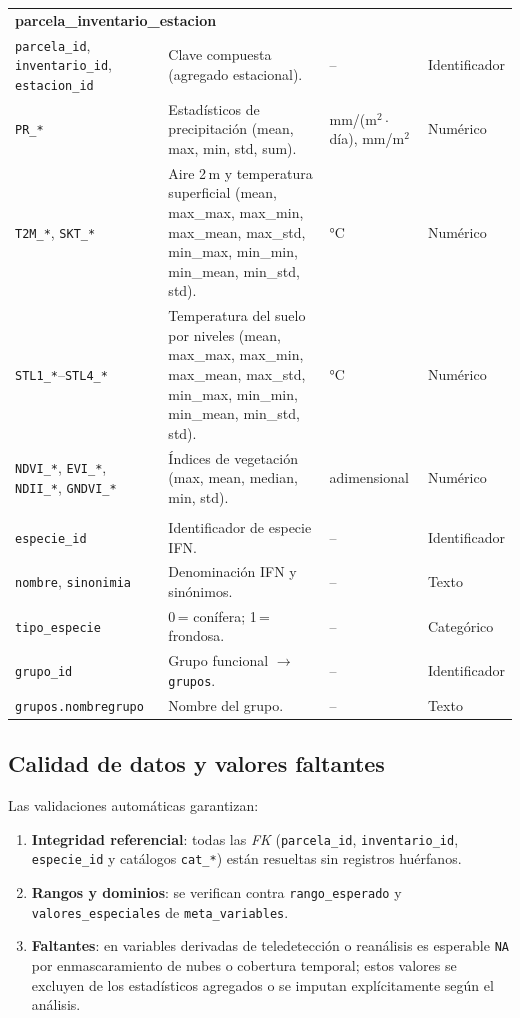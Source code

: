 \begin{longtable}{p{3.2cm} p{7.6cm} p{2.4cm} p{2.4cm}}
\multicolumn{4}{l}{\textbf{parcela\_inventario\_estacion}} \\
\texttt{parcela\_id}, \texttt{inventario\_id}, \texttt{estacion\_id} & Clave compuesta (agregado estacional). & -- & Identificador \\
\texttt{PR\_*} & Estadísticos de precipitación (mean, max, min, std, sum). & mm/(m$^2\cdot$día), mm/m$^2$ & Numérico \\
\texttt{T2M\_*}, \texttt{SKT\_*} & Aire 2\,m y temperatura superficial (mean, max\_max, max\_min, max\_mean, max\_std, min\_max, min\_min, min\_mean, min\_std, std). & °C & Numérico \\
\texttt{STL1\_*}--\texttt{STL4\_*} & Temperatura del suelo por niveles (mean, max\_max, max\_min, max\_mean, max\_std, min\_max, min\_min, min\_mean, min\_std, std). & °C & Numérico \\
\texttt{NDVI\_*}, \texttt{EVI\_*}, \texttt{NDII\_*}, \texttt{GNDVI\_*} & Índices de vegetación (max, mean, median, min, std). & adimensional & Numérico \\
\addlinespace

\multicolumn{4}{l}{\textbf{especies} y \textbf{grupos}} \\
\texttt{especie\_id} & Identificador de especie IFN. & -- & Identificador \\
\texttt{nombre}, \texttt{sinonimia} & Denominación IFN y sinónimos. & -- & Texto \\
\texttt{tipo\_especie} & 0\,= conífera; 1\,= frondosa. & -- & Categórico \\
\texttt{grupo\_id} & Grupo funcional $\rightarrow$ \texttt{grupos}. & -- & Identificador \\
\texttt{grupos.nombregrupo} & Nombre del grupo. & -- & Texto \\
\end{longtable}
\normalsize
\subsection*{Calidad de datos y valores faltantes}

Las validaciones automáticas garantizan:
\begin{enumerate}
  \item \textbf{Integridad referencial}: todas las \textit{FK} (\texttt{parcela\_id}, \texttt{inventario\_id}, \texttt{especie\_id} y catálogos \texttt{cat\_*}) están resueltas sin registros huérfanos.
  \item \textbf{Rangos y dominios}: se verifican contra \texttt{rango\_esperado} y \texttt{valores\_especiales} de \texttt{meta\_variables}.
  \item \textbf{Faltantes}: en variables derivadas de teledetección o reanálisis es esperable \texttt{NA} por enmascaramiento de nubes o cobertura temporal; estos valores se excluyen de los estadísticos agregados o se imputan explícitamente según el análisis.
\end{enumerate}
